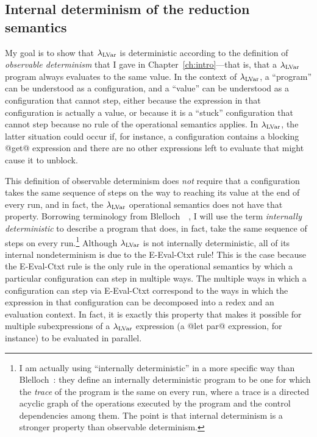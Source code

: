 \subsection{Internal determinism of the reduction semantics}

My goal is to show that $\lambda_{\textrm{LVar}}$ is deterministic according to
the definition of \emph{observable determinism} that I gave in
Chapter~\ref{ch:intro}---that is, that a $\lambda_{\textrm{LVar}}$ program always
evaluates to the same value.  In the context of $\lambda_{\textrm{LVar}}$, a
``program'' can be understood as a configuration, and a ``value'' can
be understood as a configuration that cannot step, either because the
expression in that configuration is actually a value, or because it is
a ``stuck'' configuration that cannot step because no rule of the
operational semantics applies.  In $\lambda_{\textrm{LVar}}$, the latter situation
could occur if, for instance, a configuration contains a blocking
@get@ expression and there are no other expressions left to evaluate
that might cause it to unblock.

This definition of observable determinism does \emph{not} require that
a configuration takes the same sequence of steps on the way to
reaching its value at the end of every run, and in fact, the
$\lambda_{\textrm{LVar}}$ operational semantics does not have that property.
Borrowing terminology from
Blelloch~\etal~\cite{blelloch-internally-deterministic}, I will use
the term \emph{internally deterministic} to describe a program that
does, in fact, take the same sequence of steps on every
run.\footnote{I am actually using ``internally deterministic'' in a
  more specific way than Blelloch~\etal: they define an internally
  deterministic program to be one for which the \emph{trace} of the
  program is the same on every run, where a trace is a directed
  acyclic graph of the operations executed by the program and the
  control dependencies among them.  The point is that internal
  determinism is a stronger property than observable determinism.}
Although $\lambda_{\textrm{LVar}}$ is not internally deterministic, all of its
internal nondeterminism is due to the {\sc E-Eval-Ctxt} rule!  This is
the case because the {\sc E-Eval-Ctxt} rule is the only rule in the
operational semantics by which a particular configuration can step in
multiple ways.  The multiple ways in which a configuration can step
via {\sc E-Eval-Ctxt} correspond to the ways in which the expression
in that configuration can be decomposed into a redex and an evaluation
context.  In fact, it is exactly this property that makes it possible
for multiple subexpressions of a $\lambda_{\textrm{LVar}}$ expression (a @let par@
expression, for instance) to be evaluated in parallel.

